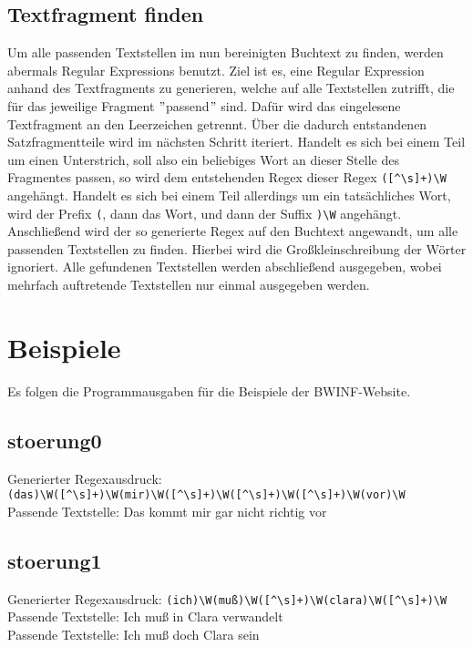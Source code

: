 \subsection{Textfragment finden}\label{subsec:textfragment-finden}
Um alle passenden Textstellen im nun bereinigten Buchtext zu finden,
werden abermals Regular Expressions benutzt.
Ziel ist es, eine Regular Expression anhand des Textfragments zu generieren, welche auf alle Textstellen zutrifft,
die für das jeweilige Fragment \("\)passend\("\) sind.
Dafür wird das eingelesene Textfragment an den Leerzeichen getrennt.
Über die dadurch entstandenen Satzfragmentteile wird im nächsten Schritt iteriert.
Handelt es sich bei einem Teil um einen Unterstrich,
soll also ein beliebiges Wort an dieser Stelle des Fragmentes passen,
so wird dem entstehenden Regex dieser Regex \verb/([^\s]+)\W/ angehängt.
Handelt es sich bei einem Teil allerdings um ein tatsächliches Wort, wird
der Prefix \verb/(/, dann das Wort, und dann der Suffix \verb/)\W/ angehängt. \\
Anschließend wird der so generierte Regex auf den Buchtext angewandt, um alle passenden Textstellen zu finden.
Hierbei wird die Großkleinschreibung der Wörter ignoriert.
Alle gefundenen Textstellen werden abschließend ausgegeben,
wobei mehrfach auftretende Textstellen nur einmal ausgegeben werden.


\section{Beispiele}\label{sec:beispiele}
Es folgen die Programmausgaben für die Beispiele der BWINF-Website.

\subsection{stoerung0}\label{subsec:stoerung0}
Generierter Regexausdruck: \verb/(das)\W([^\s]+)\W(mir)\W([^\s]+)\W([^\s]+)\W([^\s]+)\W(vor)\W/ \\
Passende Textstelle: Das kommt mir gar nicht richtig vor

\subsection{stoerung1}\label{subsec:stoerung1}
Generierter Regexausdruck: \verb/(ich)\W(muß)\W([^\s]+)\W(clara)\W([^\s]+)\W/ \\
Passende Textstelle: Ich muß in Clara verwandelt \\
Passende Textstelle: Ich muß doch Clara sein

